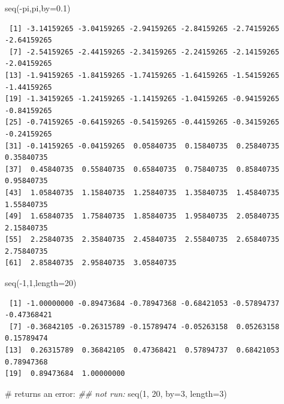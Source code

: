\documentclass[
  13,
  letterpaper,
]{report}
\newenvironment{Shaded}{\begin{snugshade}}{\end{snugshade}}
\newcommand{\AttributeTok}[1]{\textcolor[rgb]{0.40,0.45,0.13}{#1}}
\newcommand{\CommentTok}[1]{\textcolor[rgb]{0.37,0.37,0.37}{#1}}
\newcommand{\DecValTok}[1]{\textcolor[rgb]{0.68,0.00,0.00}{#1}}
\newcommand{\DocumentationTok}[1]{\textcolor[rgb]{0.37,0.37,0.37}{\textit{#1}}}
\newcommand{\FloatTok}[1]{\textcolor[rgb]{0.68,0.00,0.00}{#1}}
\newcommand{\FunctionTok}[1]{\textcolor[rgb]{0.28,0.35,0.67}{#1}}
\newcommand{\NormalTok}[1]{\textcolor[rgb]{0.00,0.23,0.31}{#1}}
\newcommand{\SpecialCharTok}[1]{\textcolor[rgb]{0.37,0.37,0.37}{#1}}
\begin{document}
\begin{Shaded}
\begin{Highlighting}[]
\FunctionTok{seq}\NormalTok{(}\SpecialCharTok{{-}}\NormalTok{pi,pi,}\AttributeTok{by=}\FloatTok{0.1}\NormalTok{)}
\end{Highlighting}
\end{Shaded}

\begin{verbatim}
 [1] -3.14159265 -3.04159265 -2.94159265 -2.84159265 -2.74159265 -2.64159265
 [7] -2.54159265 -2.44159265 -2.34159265 -2.24159265 -2.14159265 -2.04159265
[13] -1.94159265 -1.84159265 -1.74159265 -1.64159265 -1.54159265 -1.44159265
[19] -1.34159265 -1.24159265 -1.14159265 -1.04159265 -0.94159265 -0.84159265
[25] -0.74159265 -0.64159265 -0.54159265 -0.44159265 -0.34159265 -0.24159265
[31] -0.14159265 -0.04159265  0.05840735  0.15840735  0.25840735  0.35840735
[37]  0.45840735  0.55840735  0.65840735  0.75840735  0.85840735  0.95840735
[43]  1.05840735  1.15840735  1.25840735  1.35840735  1.45840735  1.55840735
[49]  1.65840735  1.75840735  1.85840735  1.95840735  2.05840735  2.15840735
[55]  2.25840735  2.35840735  2.45840735  2.55840735  2.65840735  2.75840735
[61]  2.85840735  2.95840735  3.05840735
\end{verbatim}

\begin{Shaded}
\begin{Highlighting}[]
\FunctionTok{seq}\NormalTok{(}\SpecialCharTok{{-}}\DecValTok{1}\NormalTok{,}\DecValTok{1}\NormalTok{,}\AttributeTok{length=}\DecValTok{20}\NormalTok{)}
\end{Highlighting}
\end{Shaded}

\begin{verbatim}
 [1] -1.00000000 -0.89473684 -0.78947368 -0.68421053 -0.57894737 -0.47368421
 [7] -0.36842105 -0.26315789 -0.15789474 -0.05263158  0.05263158  0.15789474
[13]  0.26315789  0.36842105  0.47368421  0.57894737  0.68421053  0.78947368
[19]  0.89473684  1.00000000
\end{verbatim}

\begin{Shaded}
\begin{Highlighting}[]
\CommentTok{\# returns an error:}
\DocumentationTok{\#\# not run:}
\FunctionTok{seq}\NormalTok{(}\DecValTok{1}\NormalTok{, }\DecValTok{20}\NormalTok{, }\AttributeTok{by=}\DecValTok{3}\NormalTok{, }\AttributeTok{length=}\DecValTok{3}\NormalTok{)}
\end{Highlighting}
\end{Shaded}
\end{document}
